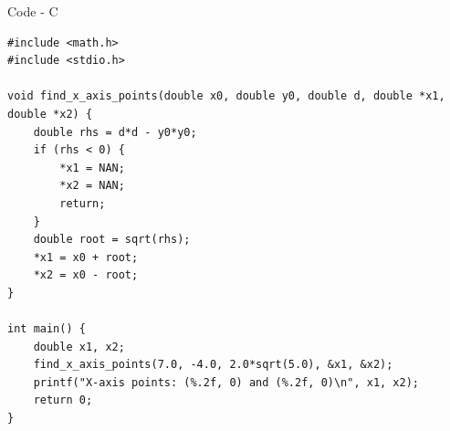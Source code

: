 \documentclass{beamer}
\theoremstyle{remark}
\numberwithin{equation}{section}
\begin{document}
\begin{frame}[fragile]{Code - C}
\begin{lstlisting}
#include <math.h>
#include <stdio.h>

void find_x_axis_points(double x0, double y0, double d, double *x1, double *x2) {
    double rhs = d*d - y0*y0;
    if (rhs < 0) {
        *x1 = NAN;
        *x2 = NAN;
        return;
    }
    double root = sqrt(rhs);
    *x1 = x0 + root;
    *x2 = x0 - root;
}

int main() {
    double x1, x2;
    find_x_axis_points(7.0, -4.0, 2.0*sqrt(5.0), &x1, &x2);
    printf("X-axis points: (%.2f, 0) and (%.2f, 0)\n", x1, x2);
    return 0;
}    
\end{lstlisting}  
\end{frame}
\end{document}
